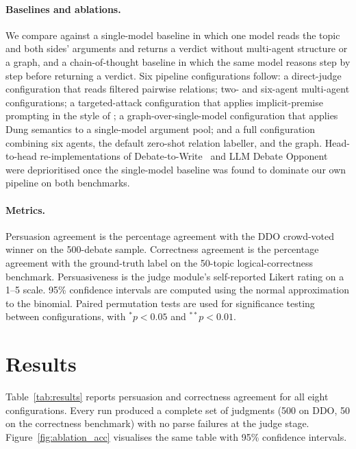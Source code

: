 \documentclass[11pt,twocolumn,letterpaper]{article}
\newcommand{\HumanTestTopics}{50}
\newcommand{\DDOSample}{500}
\begin{document}
\paragraph{Baselines and ablations.}
We compare against a single-model baseline in which one model reads
the topic and both sides' arguments and returns a verdict without
multi-agent structure or a graph, and a chain-of-thought baseline in
which the same model reasons step by step before returning a
verdict. Six pipeline configurations follow: a direct-judge
configuration that reads filtered pairwise relations; two- and
six-agent multi-agent configurations; a targeted-attack
configuration that applies implicit-premise prompting in the style
of \citet{ozaki2025llmdebate}; a graph-over-single-model
configuration that applies Dung semantics to a single-model
argument pool; and a full configuration combining six agents,
the default zero-shot relation labeller, and the graph. Head-to-head re-implementations of
Debate-to-Write~\citep{hu2025debate2write} and LLM Debate
Opponent~\citep{ozaki2025llmdebate} were deprioritised once the
single-model baseline was found to dominate our own pipeline on
both benchmarks.

\paragraph{Metrics.}
Persuasion agreement is the percentage agreement with the DDO
crowd-voted winner on the \DDOSample-debate sample. Correctness
agreement is the percentage agreement with the ground-truth label
on the \HumanTestTopics-topic logical-correctness benchmark.
Persuasiveness is the judge module's self-reported Likert rating on
a 1--5 scale. 95\% confidence intervals are computed using the
normal approximation to the binomial. Paired permutation tests are
used for significance testing between configurations, with
${}^{*}p<0.05$ and ${}^{**}p<0.01$.

\section{Results}
\label{sec:results}

Table~\ref{tab:results} reports persuasion and correctness
agreement for all eight configurations. Every run produced a
complete set of judgments (\DDOSample{} on DDO, \HumanTestTopics{}
on the correctness benchmark) with no parse failures at the judge
stage.
Figure~\ref{fig:ablation_acc} visualises the same table with
95\% confidence intervals.
\end{document}
